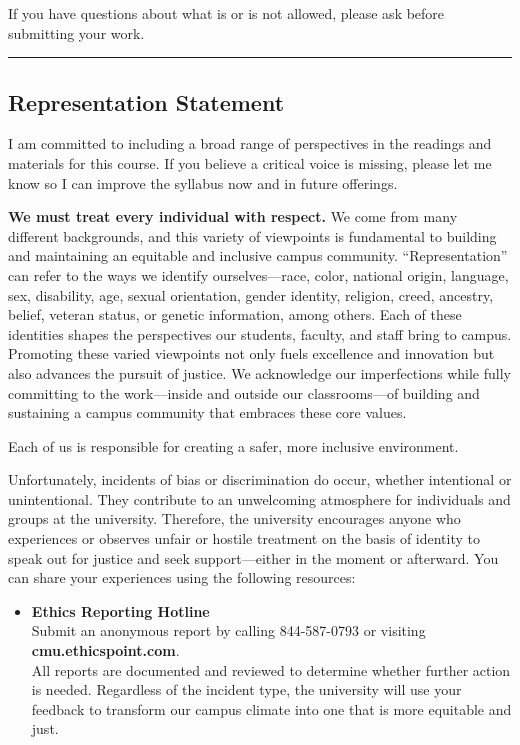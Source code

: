 \documentclass[]{tufte-handout}
\providecommand{\tightlist}{%
  \setlength{\itemsep}{0pt}\setlength{\parskip}{0pt}}
\begin{document}
If you have questions about what is or is not allowed, please ask before
submitting your work.

\begin{center}\rule{0.5\linewidth}{0.5pt}\end{center}

\hypertarget{representation-statement}{%
\subsection{Representation Statement}\label{representation-statement}}

I am committed to including a broad range of perspectives in the
readings and materials for this course. If you believe a critical voice
is missing, please let me know so I can improve the syllabus now and in
future offerings.

\textbf{We must treat every individual with respect.} We come from many
different backgrounds, and this variety of viewpoints is fundamental to
building and maintaining an equitable and inclusive campus community.
``Representation'' can refer to the ways we identify ourselves---race,
color, national origin, language, sex, disability, age, sexual
orientation, gender identity, religion, creed, ancestry, belief, veteran
status, or genetic information, among others. Each of these identities
shapes the perspectives our students, faculty, and staff bring to
campus. Promoting these varied viewpoints not only fuels excellence and
innovation but also advances the pursuit of justice. We acknowledge our
imperfections while fully committing to the work---inside and outside
our classrooms---of building and sustaining a campus community that
embraces these core values.

Each of us is responsible for creating a safer, more inclusive
environment.

Unfortunately, incidents of bias or discrimination do occur, whether
intentional or unintentional. They contribute to an unwelcoming
atmosphere for individuals and groups at the university. Therefore, the
university encourages anyone who experiences or observes unfair or
hostile treatment on the basis of identity to speak out for justice and
seek support---either in the moment or afterward. You can share your
experiences using the following resources:

\begin{itemize}
\tightlist
\item
  \textbf{Ethics Reporting Hotline}\\
  Submit an anonymous report by calling 844-587-0793 or visiting
  \textbf{cmu.ethicspoint.com}.\\
  All reports are documented and reviewed to determine whether further
  action is needed. Regardless of the incident type, the university will
  use your feedback to transform our campus climate into one that is
  more equitable and just.
\end{itemize}
\end{document}
